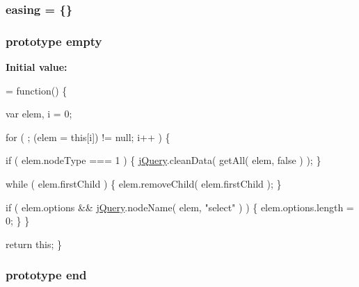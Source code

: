 \hypertarget{jquery-1_810_82-vsdoc_8js_a9758a312629fa6de1744280dd6e6253b}{
\subsubsection[{easing}]{ easing = \{\}}}\label{jquery-1_810_82-vsdoc_8js_a9758a312629fa6de1744280dd6e6253b}
\hypertarget{jquery-1_810_82-vsdoc_8js_ad242f812bdc5013e0cbf15d6e4d6800a}{
\subsubsection[{empty}]{ {\bf prototype} empty}}\label{jquery-1_810_82-vsdoc_8js_ad242f812bdc5013e0cbf15d6e4d6800a}
{\bfseries Initial value\-:}
\begin{DoxyCode}
= \textcolor{keyword}{function}() \{


        var elem,
            i = 0;

        \textcolor{keywordflow}{for} ( ; (elem = \textcolor{keyword}{this}[i]) != null; i++ ) \{
            
            \textcolor{keywordflow}{if} ( elem.nodeType === 1 ) \{
                \hyperlink{jquery-1_810_82-vsdoc_8js_add5237586d970a38a81f990e8eb28c6c}{jQuery}.cleanData( getAll( elem, \textcolor{keyword}{false} ) );
            \}

            
            \textcolor{keywordflow}{while} ( elem.firstChild ) \{
                elem.removeChild( elem.firstChild );
            \}

            
            
            \textcolor{keywordflow}{if} ( elem.options && \hyperlink{jquery-1_810_82-vsdoc_8js_add5237586d970a38a81f990e8eb28c6c}{jQuery}.nodeName( elem, \textcolor{stringliteral}{"select"} ) ) \{
                elem.options.length = 0;
            \}
        \}

        \textcolor{keywordflow}{return} \textcolor{keyword}{this};
    \}
\end{DoxyCode}
\hypertarget{jquery-1_810_82-vsdoc_8js_af2ce7c86b4e6e9d61f85745258f4ef32}{
\subsubsection[{end}]{ {\bf prototype} end}}\label{jquery-1_810_82-vsdoc_8js_af2ce7c86b4e6e9d61f85745258f4ef32}

